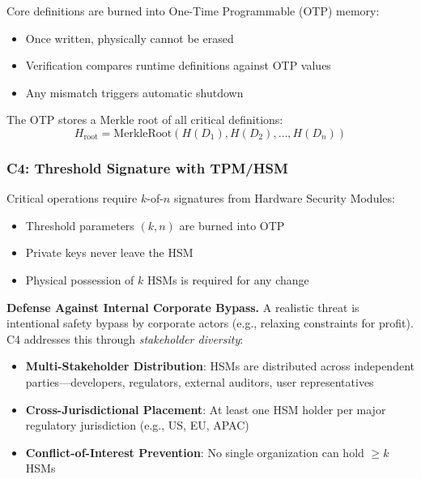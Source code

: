 \documentclass[11pt,a4paper]{article}
\begin{document}
Core definitions are burned into One-Time Programmable (OTP) memory:
\begin{itemize}
    \item Once written, physically cannot be erased
    \item Verification compares runtime definitions against OTP values
    \item Any mismatch triggers automatic shutdown
\end{itemize}

The OTP stores a Merkle root of all critical definitions:
\begin{equation}
H_{\text{root}} = \text{MerkleRoot}(H(D_1), H(D_2), \ldots, H(D_n))
\end{equation}

\subsubsection{C4: Threshold Signature with TPM/HSM}

Critical operations require $k$-of-$n$ signatures from Hardware Security Modules:
\begin{itemize}
    \item Threshold parameters $(k, n)$ are burned into OTP
    \item Private keys never leave the HSM
    \item Physical possession of $k$ HSMs is required for any change
\end{itemize}

\textbf{Defense Against Internal Corporate Bypass.}
A realistic threat is intentional safety bypass by corporate actors (e.g., relaxing constraints for profit).
C4 addresses this through \emph{stakeholder diversity}:

\begin{itemize}
    \item \textbf{Multi-Stakeholder Distribution}: HSMs are distributed across independent parties---developers, regulators, external auditors, user representatives
    \item \textbf{Cross-Jurisdictional Placement}: At least one HSM holder per major regulatory jurisdiction (e.g., US, EU, APAC)
    \item \textbf{Conflict-of-Interest Prevention}: No single organization can hold $\geq k$ HSMs
\end{itemize}
\end{document}
